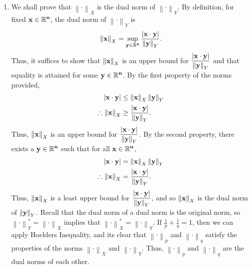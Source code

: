 \documentclass[a4paper,11pt]{article}
\newcommand{\norm}[1]{\left\lVert#1\right\rVert}
\newcommand{\ds}{\displaystyle}
\begin{document}
{{\begin{enumerate}[leftmargin=*]
			\begin{align*}
				\sum_{n=N}^{\infty} \frac{1}{n^3} & \geq \int_{N}^{\infty} \frac{1}{x^3}dx\\
												  & = \lim_{k \to \infty} \int_{N}^k \frac{1}{x^3}dx\\
												  & = \lim_{k \to \infty} \left[\frac{-1}{2x^2}\right]^{k}_{N-1}\\
												  & = \lim_{k \to \infty} \left[\frac{-1}{2k^2} + \frac{-1}{2N^2}\right]\\
												  & = \frac{1}{2N^2}\\
				\therefore \left|\sum_{n=N}^{\infty} \frac{1}{n^3}\right| & \geq \frac{1}{2}\left|\frac{1}{N^2}\right| \text{ as } N>1.
			\end{align*}
			Clearly, $\ds{M_1 = \frac{1}{2}}$, $\ds{N_1 = 1}$, and so $$\frac{1}{N^2} = O\left(\sum_{n=N}^{\infty} \frac{1}{n^3}\right).$$ Thus, $$\sum_{n=N}^{\infty} \frac{1}{n^3} = \Theta \left(\frac{1}{N^2}\right).$$

		\item We shall prove that $\ds{\norm{\cdot}_X}$ is the dual norm of $\ds{\norm{\cdot}_Y}$. By definition, for fixed $\ds{\bf{x} \in \mathbb{R}^n}$, the dual norm of $\ds{\norm{\cdot}_Y}$ is $$\norm{\bf{x}}_X = \sup_{\bf{y} \in \mathbb{R}^n} \frac{|\bf{x}\cdot\bf{y}|}{\norm{\bf{y}}_Y}.$$ Thus, it suffices to show that $\ds{\norm{\bf{x}}_X}$ is an upper bound for $\ds{\frac{|\bf{x}\cdot\bf{y}|}{\norm{\bf{y}}_Y}}$ and that equality is attained for some $\ds{\bf{y} \in \mathbb{R}^n}$. By the first property of the norms provided, 
			\begin{align*}
				|\bf{x}\cdot\bf{y}| & \leq \norm{\bf{x}}_X\norm{\bf{y}}_Y\\
				\therefore \norm{\bf{x}}_X & \geq \frac{|\bf{x}\cdot\bf{y}|}{\norm{\bf{y}}_Y}.
			\end{align*}
			Thus, $\ds{\norm{\bf{x}}_X}$ is an upper bound for $\ds{\frac{|\bf{x}\cdot\bf{y}|}{\norm{\bf{y}}_Y}}$. By the second property, there exists a $\ds{\bf{y} \in \mathbb{R}^n}$ such that for all $\ds{\bf{x} \in \mathbb{R}^n}$,
			\begin{align*}
				|\bf{x}\cdot\bf{y}| & = \norm{\bf{x}}_X\norm{\bf{y}}_Y\\
				\therefore \norm{\bf{x}}_X & = \frac{|\bf{x}\cdot\bf{y}|}{\norm{\bf{y}}_Y}.
			\end{align*}
			Thus, $\ds{\norm{\bf{x}}_X}$ is a least upper bound for $\ds{\frac{|\bf{x}\cdot\bf{y}|}{\norm{\bf{y}}_Y}}$, and so $\ds{\norm{\bf{x}}_X}$ is the dual norm of $\ds{\norm{\bf{y}}_Y}$. Recall that the dual norm of a dual norm is the original norm, so $\ds{\norm{\cdot}_Y^* = \norm{\cdot}_X}$ implies that $\ds{\norm{\cdot}_X^* = \norm{\cdot}_Y}$. If $\ds{\frac{1}{p} + \frac{1}{q} = 1}$, then we can apply Hoelders Inequality, and its clear that $\ds{\norm{\cdot}_p}$ and $\ds{\norm{\cdot}_q}$ satisfy the properties of the norms $\ds{\norm{\cdot}_X}$ and $\ds{\norm{\cdot}_Y}$. Thus, $\ds{\norm{\cdot}_p}$ and $\ds{\norm{\cdot}_q}$ are the dual norms of each other.



\end{enumerate}}}
\end{document}
